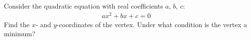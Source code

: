 Consider the quadratic equation with real coefficients $a$, $b$, $c$:
\begin{align*}
a x^2 + b x + c = 0
\end{align*}
Find the $x$- and $y$-coordinates of the vertex. Under what condition is the vertex a minimum? 

